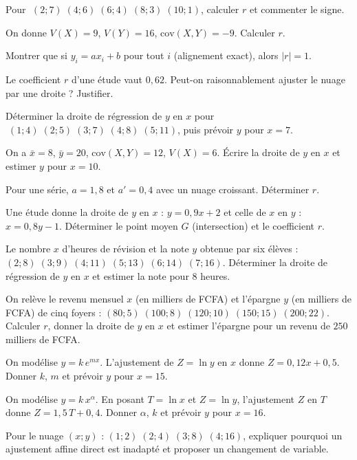 \exo{} Pour $\;(2;7)\;(4;6)\;(6;4)\;(8;3)\;(10;1)$, calculer $r$ et commenter le signe.

\exo{} On donne $V(X)=9$, $V(Y)=16$, $\mathrm{cov}(X,Y)=-9$. Calculer $r$.

\exo{} Montrer que si $y_i=ax_i+b$ pour tout $i$ (alignement exact), alors $|r|=1$.

\exo{} Le coefficient $r$ d'une étude vaut $0{,}62$. Peut-on raisonnablement ajuster
le nuage par une droite ? Justifier.


\exo{} Déterminer la droite de régression de $y$ en $x$ pour
$\;(1;4)\;(2;5)\;(3;7)\;(4;8)\;(5;11)$, puis prévoir $y$ pour $x=7$.

\exo{} On a $\bar x=8$, $\bar y=20$, $\mathrm{cov}(X,Y)=12$, $V(X)=6$. Écrire la droite
de $y$ en $x$ et estimer $y$ pour $x=10$.

\exo{} Pour une série, $a=1{,}8$ et $a'=0{,}4$ avec un nuage croissant.
Déterminer $r$.

\exo{} Une étude donne la droite de $y$ en $x$ : $y=0{,}9x+2$ et celle de $x$ en $y$ :
$x=0{,}8y-1$. Déterminer le point moyen $G$ (intersection) et le coefficient $r$.

\exo{} Le nombre $x$ d'heures de révision et la note $y$ obtenue par six élèves :
$(2;8)\;(3;9)\;(4;11)\;(5;13)\;(6;14)\;(7;16)$. Déterminer la droite de régression de $y$ en
$x$ et estimer la note pour $8$ heures.

\exo{} On relève le revenu mensuel $x$ (en milliers de FCFA) et l'épargne $y$
(en milliers de FCFA) de cinq foyers : $(80;5)\;(100;8)\;(120;10)\;(150;15)\;(200;22)$.
Calculer $r$, donner la droite de $y$ en $x$ et estimer l'épargne pour un revenu de
$250$ milliers de FCFA.


\exo{} On modélise $y=k\,e^{mx}$. L'ajustement de $Z=\ln y$ en $x$ donne
$Z=0{,}12x+0{,}5$. Donner $k$, $m$ et prévoir $y$ pour $x=15$.

\exo{} On modélise $y=k\,x^{\alpha}$. En posant $T=\ln x$ et $Z=\ln y$, l'ajustement
$Z$ en $T$ donne $Z=1{,}5\,T+0{,}4$. Donner $\alpha$, $k$ et prévoir $y$ pour $x=16$.

\exo{} Pour le nuage $(x;y)$ : $(1;2)\;(2;4)\;(3;8)\;(4;16)$, expliquer pourquoi un
ajustement affine direct est inadapté et proposer un changement de variable.

